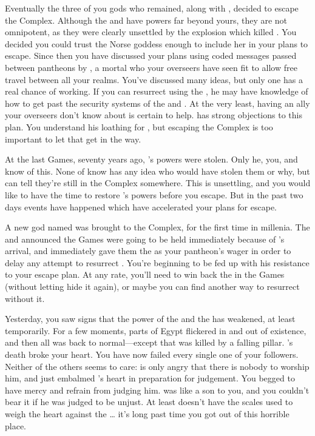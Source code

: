 \documentclass[char]{guardians}
\begin{document}
Eventually the three of you gods who remained, along with \cEgyptianHuman{}, decided to escape the Complex. Although the \cWarden{} and \cCaretaker{} have powers far beyond yours, they are not omnipotent, as they were clearly unsettled by the explosion which killed \cSet{}. You decided you could trust the Norse goddess \cHel{} enough to include her in your plans to escape. Since then you have discussed your plans using coded messages passed between pantheons by \cJascha{}, a mortal who your overseers have seen fit to allow free travel between all your realms. You've discussed many ideas, but only one has a real chance of working. If you can resurrect \cSet{} using the \iNecro{\MYname}, he may have knowledge of how to get past the security systems of the \cWarden{} and \cCaretaker{}. At the very least, having an ally your overseers don't know about is certain to help. \cOsiris{} has strong objections to this plan. You understand his loathing for \cSet{}, but escaping the Complex is too important to let that get in the way.


At the last Games, seventy years ago, \cOsiris{}'s powers were stolen. Only he, you, and \cAnubis{} know of this. None of know has any idea who would have stolen them or why, but \cOsiris{} can tell they're still in the Complex somewhere. This is unsettling, and you would like to have the time to restore \cOsiris{}'s powers before you escape. But in the past two days events have happened which have accelerated your plans for escape.

A new god named \cUnity{} was brought to the Complex, for the first time in millenia. The \cWarden{} and \cCaretaker{} announced the Games were going to be held immediately because of \cUnity{}'s arrival, and \cOsiris{} immediately gave them the \iNecro{\MYname} as your pantheon's wager in order to delay any attempt to resurrect \cSet{}. You're beginning to be fed up with his resistance to your escape plan. At any rate, you'll need to win back the \iNecro{\MYname} in the Games (without letting \cOsiris{} hide it again), or maybe you can find another way to resurrect \cSet{} without it.

Yesterday, you saw signs that the power of the \cWarden{} and the \cCaretaker{} has weakened, at least temporarily. For a few moments, parts of Egypt flickered in and out of existence, and then all was back to normal---except that \cEgyptianHuman{} was killed by a falling pillar. \cEgyptianHuman{}'s death broke your heart. You have now failed every single one of your followers. Neither of the others seems to care: \cOsiris{} is only angry that there is nobody to worship him, and \cAnubis{} just embalmed \cEgyptianHuman{}'s heart in preparation for judgement. You begged \cAnubis{} to have mercy and refrain from judging him. \cEgyptianHuman{} was like a son to you, and you couldn't bear it if he was judged to be unjust. At least \cAnubis{} doesn't have the scales used to weigh the heart against the \iFeather{\MYname}\ldots{} it's long past time you got out of this horrible place.
\end{document}
